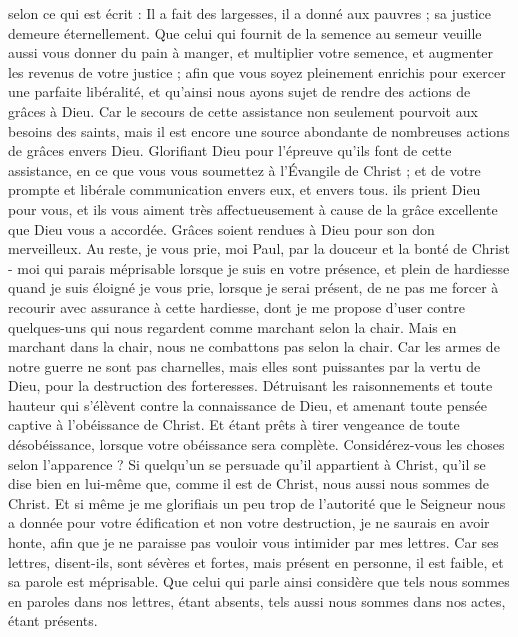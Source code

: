 \begin{multicols}{2}
selon ce qui est écrit : Il a fait des largesses, il a donné aux pauvres ; sa justice demeure éternellement.
Que celui qui fournit de la semence au semeur veuille aussi vous donner du pain à manger, et multiplier votre semence, et augmenter les revenus de votre justice ;
afin que vous soyez pleinement enrichis pour exercer une parfaite libéralité, et qu’ainsi nous ayons sujet de rendre des actions de grâces à Dieu.
Car le secours de cette assistance non seulement pourvoit aux besoins des saints, mais il est encore une source abondante de nombreuses actions de grâces envers Dieu.
Glorifiant Dieu pour l’épreuve qu’ils font de cette assistance, en ce que vous vous soumettez à l’Évangile de Christ ; et de votre prompte et libérale communication envers eux, et envers tous.
ils prient Dieu pour vous, et ils vous aiment très affectueusement à cause de la grâce excellente que Dieu vous a accordée.
Grâces soient rendues à Dieu pour son don merveilleux.
\VerseOne{}Au reste, je vous prie, moi Paul, par la douceur et la bonté de Christ - moi qui parais méprisable lorsque je suis en votre présence, et plein de hardiesse quand je suis éloigné
je vous prie, lorsque je serai présent, de ne pas me forcer à recourir avec assurance à cette hardiesse, dont je me propose d’user contre quelques-uns qui nous regardent comme marchant selon la chair.
Mais en marchant dans la chair, nous ne combattons pas selon la chair.
Car les armes de notre guerre ne sont pas charnelles, mais elles sont puissantes par la vertu de Dieu, pour la destruction des forteresses.
Détruisant les raisonnements et toute hauteur qui s'élèvent contre la connaissance de Dieu, et amenant toute pensée captive à l'obéissance de Christ.
Et étant prêts à tirer vengeance de toute désobéissance, lorsque votre obéissance sera complète.
Considérez-vous les choses selon l'apparence ? Si quelqu'un se persuade qu’il appartient à Christ, qu'il se dise bien en lui-même que, comme il est de Christ, nous aussi nous sommes de Christ.
Et si même je me glorifiais un peu trop de l’autorité que le Seigneur nous a donnée pour votre édification et non votre destruction, je ne saurais en avoir honte,
afin que je ne paraisse pas vouloir vous intimider par mes lettres.
Car ses lettres, disent-ils, sont sévères et fortes, mais présent en personne, il est faible, et sa parole est méprisable.
Que celui qui parle ainsi considère que tels nous sommes en paroles dans nos lettres, étant absents, tels aussi nous sommes dans nos actes, étant présents.

\end{multicols}
